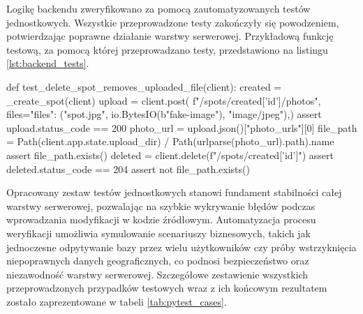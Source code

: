                 Logikę backendu zweryfikowano za pomocą zautomatyzowanych testów jednostkowych. Wszystkie przeprowadzone testy zakończyły się powodzeniem, potwierdzając poprawne działanie warstwy serwerowej. Przykładową funkcję testową, za pomocą której przeprowadzano testy, przedstawiono na listingu \ref{lst:backend_tests}.

                \begin{code}[
    language=Python,
    caption={Funkcja testująca poprawne przesyłanie i usuwanie \enquote{spotów}.},
    label={lst:backend_tests}
]
def test_delete_spot_removes_uploaded_file(client):
    created = _create_spot(client)
    upload = client.post(
        f"/spots/{created['id']}/photos",
        files={"files": ("spot.jpg", io.BytesIO(b"fake-image"), "image/jpeg")},)
    assert upload.status_code == 200
    photo_url = upload.json()["photo_urls"][0]
    file_path = Path(client.app.state.upload_dir) / 
    Path(urlparse(photo_url).path).name
    assert file_path.exists()
    deleted = client.delete(f"/spots/{created['id']}")
    assert deleted.status_code == 204
    assert not file_path.exists()\end{code}

Opracowany zestaw testów jednostkowych stanowi fundament stabilności całej warstwy serwerowej, pozwalając na szybkie wykrywanie błędów podczas wprowadzania modyfikacji w kodzie źródłowym. Automatyzacja procesu weryfikacji umożliwia symulowanie scenariuszy biznesowych, takich jak jednoczesne odpytywanie bazy przez wielu użytkowników czy próby wstrzyknięcia niepoprawnych danych geograficznych, co podnosi bezpieczeństwo oraz niezawodność warstwy serwerowej. Szczegółowe zestawienie wszystkich przeprowadzonych przypadków testowych wraz z ich końcowym rezultatem zostało zaprezentowane w tabeli \ref{tab:pytest_cases}.

